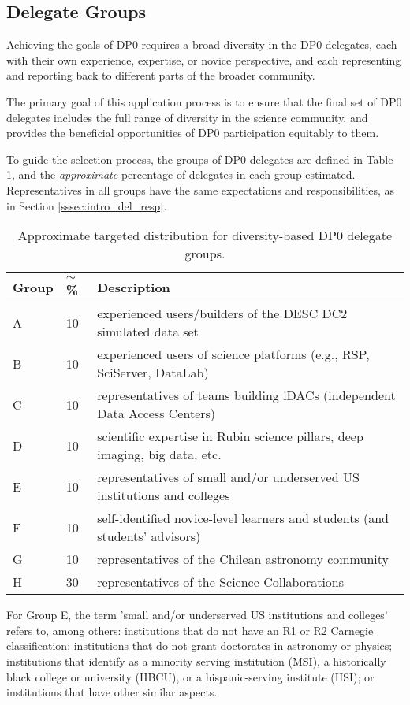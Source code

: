 \documentclass[DM,lsstdraft,authoryear,toc]{lsstdoc}
\begin{document}
\subsection{Delegate Groups}\label{ssec:sel_grps}

Achieving the goals of DP0 requires a broad diversity in the DP0 delegates, each with their own experience, expertise, or novice perspective, and each representing and reporting back to different parts of the broader community.

The primary goal of this application process is to ensure that the final set of DP0 delegates includes the full range of diversity in the science community, and provides the beneficial opportunities of DP0 participation equitably to them.

To guide the selection process, the groups of DP0 delegates are defined in Table \ref{tab:delegate_groups}, and the \emph{approximate} percentage of delegates in each group estimated.
Representatives in all groups have the same expectations and responsibilities, as in Section \ref{sssec:intro_del_resp}.

\begin{table}[!h]
\centering
\caption{Approximate targeted distribution for diversity-based DP0 delegate groups.}\label{tab:delegate_groups}
\begin{tabular}{lll}
\hline
Group & $\sim$\% & Description \\
\hline \hline
A & 10 & experienced users/builders of the DESC DC2 simulated data set \\
B & 10 & experienced users of science platforms (e.g., RSP, SciServer, DataLab) \\
C & 10 & representatives of teams building iDACs (independent Data Access Centers) \\
D & 10 & scientific expertise in Rubin science pillars, deep imaging, big data, etc. \\
E & 10 & representatives of small and/or underserved US institutions and colleges \\
F & 10 & self-identified novice-level learners and students (and students' advisors) \\
G & 10 & representatives of the Chilean astronomy community \\
H & 30 & representatives of the Science Collaborations \\
\hline
\end{tabular}
\end{table}

For Group E, the term 'small and/or underserved US institutions and colleges' refers to, among others: institutions that do not have an R1 or R2 Carnegie classification; institutions that do not grant doctorates in astronomy or physics; institutions that identify as a minority serving institution (MSI), a historically black college or university (HBCU), or a hispanic-serving institute (HSI); or institutions that have other similar aspects.
\end{document}
